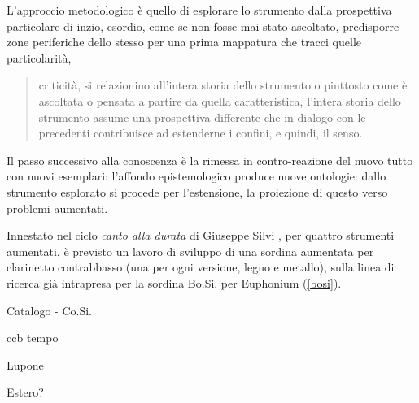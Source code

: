 \documentclass{gs-adonis}
\begin{document}
L'approccio metodologico è quello di esplorare lo strumento dalla prospettiva
particolare di inzio, esordio, come se non fosse mai stato ascoltato,
predisporre zone periferiche dello stesso per una prima mappatura che tracci
quelle particolarità,

\begin{quote}
  criticità, si relazionino all'intera storia dello strumento o piuttosto
  come è ascoltata o pensata a partire da quella caratteristica, l'intera
  storia dello strumento assume una prospettiva differente che in dialogo con
  le precedenti contribuisce ad estenderne i confini, e quindi, il senso.
\end{quote}


Il passo successivo alla conoscenza è la rimessa in contro-reazione del nuovo
tutto con nuovi esemplari: l'affondo epistemologico produce nuove ontologie:
dallo strumento esplorato si procede per l'estensione, la proiezione di questo
verso problemi aumentati.

Innestato nel ciclo \emph{canto alla durata} di Giuseppe Silvi
\cite{gs:cad, gs:artQ13}, per quattro strumenti aumentati, è previsto un lavoro
di sviluppo di una sordina aumentata per clarinetto contrabbasso (una per ogni
versione, legno e metallo), sulla linea di ricerca già intrapresa per la sordina
Bo.Si. per Euphonium (\ref{bosi}).

\begin{description}
  \item[Catalogo - Co.Si.]
\end{description}

\begin{description}
  \item[ccb tempo]
\end{description}

\begin{description}
  \item[Lupone]
\end{description}









Estero?

\end{document}
